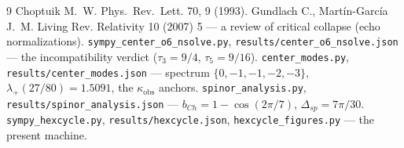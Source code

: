 \documentclass[11pt,a4paper]{article}
\newcommand{\tauu}{\tau_{3}}
\newcommand{\tauf}{\tau_{5}}
\begin{document}
\begin{thebibliography}{9}
 Choptuik M.~W. Phys.~Rev.~Lett. 70, 9 (1993).
 Gundlach C., Mart\'in-Garc\'ia J.~M. Living Rev.
  Relativity 10 (2007) 5 --- a review of critical collapse (echo
  normalizations).
 \texttt{sympy\_center\_o6\_nsolve.py},
  \texttt{results/center\_o6\_nsolve.json} --- the incompatibility verdict
  ($\tauu = 9/4$, $\tauf = 9/16$).
 \texttt{center\_modes.py},
  \texttt{results/center\_modes.json} --- spectrum $\{0,-1,-1,-2,-3\}$,
  $\lambda_+(27/80) = 1.5091$, the $\kappa_{\mathrm{obs}}$ anchors.
 \texttt{spinor\_analysis.py},
  \texttt{results/spinor\_analysis.json} --- $b_{Ch} = 1-\cos(2\pi/7)$,
  $\Delta_{sp} = 7\pi/30$.
 \texttt{sympy\_hexcycle.py}, \texttt{results/hexcycle.json},
  \texttt{hexcycle\_figures.py} --- the present machine.
\end{thebibliography}
\end{document}
